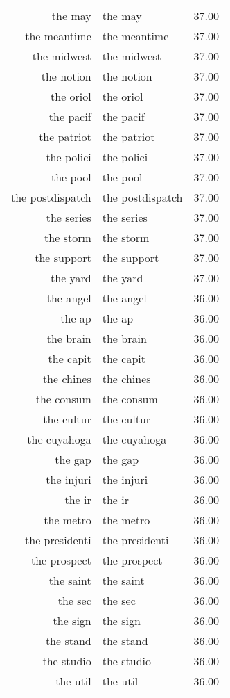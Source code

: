 \begin{table}[ht]
\begin{tabular}{rlr}
  the may & the may & 37.00 \\ 
  the meantime & the meantime & 37.00 \\ 
  the midwest & the midwest & 37.00 \\ 
  the notion & the notion & 37.00 \\ 
  the oriol & the oriol & 37.00 \\ 
  the pacif & the pacif & 37.00 \\ 
  the patriot & the patriot & 37.00 \\ 
  the polici & the polici & 37.00 \\ 
  the pool & the pool & 37.00 \\ 
  the postdispatch & the postdispatch & 37.00 \\ 
  the series & the series & 37.00 \\ 
  the storm & the storm & 37.00 \\ 
  the support & the support & 37.00 \\ 
  the yard & the yard & 37.00 \\ 
  the angel & the angel & 36.00 \\ 
  the ap & the ap & 36.00 \\ 
  the brain & the brain & 36.00 \\ 
  the capit & the capit & 36.00 \\ 
  the chines & the chines & 36.00 \\ 
  the consum & the consum & 36.00 \\ 
  the cultur & the cultur & 36.00 \\ 
  the cuyahoga & the cuyahoga & 36.00 \\ 
  the gap & the gap & 36.00 \\ 
  the injuri & the injuri & 36.00 \\ 
  the ir & the ir & 36.00 \\ 
  the metro & the metro & 36.00 \\ 
  the presidenti & the presidenti & 36.00 \\ 
  the prospect & the prospect & 36.00 \\ 
  the saint & the saint & 36.00 \\ 
  the sec & the sec & 36.00 \\ 
  the sign & the sign & 36.00 \\ 
  the stand & the stand & 36.00 \\ 
  the studio & the studio & 36.00 \\ 
  the util & the util & 36.00 \\ 

\end{tabular}
\end{table}
